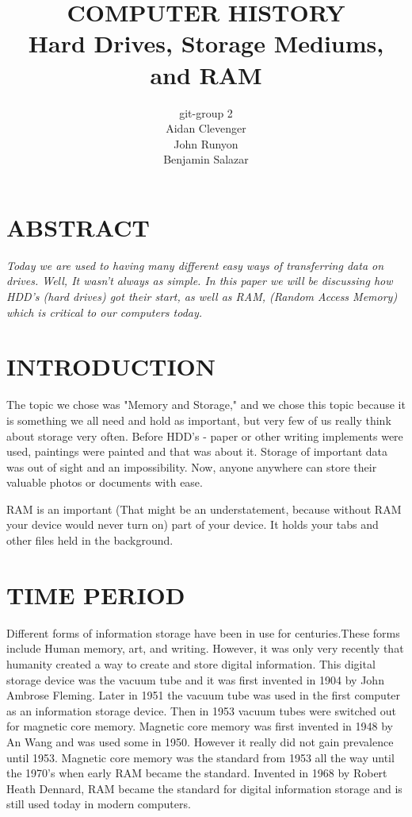 \documentclass[letterpaper, 10 pt, conference]{IEEEconf}
\title{\LARGE \bf
COMPUTER HISTORY\\
\large Hard Drives, Storage Mediums, and RAM
}
\author{git-group 2\\
\small Aidan Clevenger\\
\small John Runyon\\
\small Benjamin Salazar\\
}
\begin{document}
\maketitle
\thispagestyle{empty}
\pagestyle{empty}


\section*{ABSTRACT}
\textit{
Today we are used to having many different easy ways of transferring data on drives. Well, It wasn't always as simple. In this paper we will be discussing how HDD's (hard drives) got their start, as well as RAM, (Random Access Memory) which is critical to our computers today.
}

\section{INTRODUCTION}

The topic we chose was "Memory and Storage," and we chose this topic because it is something we all need and hold as important, but very few of us really think about storage very often. Before HDD's - paper or other writing implements were used, paintings were painted and that was about it. Storage of important data was out of sight and an impossibility. Now, anyone anywhere can store their valuable photos or documents with ease. 

RAM is an important (That might be an understatement, because without RAM your device would never turn on) part of your device. It holds your tabs and other files held in the background.

\section{TIME PERIOD}
Different forms of information storage have been in use for centuries.These forms include Human memory, art, and writing. However, it was only very recently that humanity created a way to create and store digital information. This digital storage device was the vacuum tube and it was first invented in 1904 by John Ambrose Fleming. Later in 1951 the vacuum tube was used in the first computer as an information storage device. Then in 1953 vacuum tubes were switched out for magnetic core memory. Magnetic core memory was first invented in 1948 by An Wang and was used some in 1950. However it really did not gain prevalence until 1953. Magnetic core memory was the standard from 1953 all the way until the 1970's when early RAM became the standard. Invented in 1968 by Robert Heath Dennard, RAM became the standard for digital information storage and is still used today in modern computers. 
\end{document}
